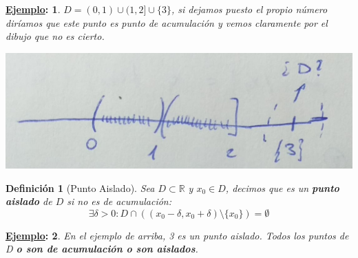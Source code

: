 \documentclass[10pt,a4paper,openright]{book}
\theoremstyle{break}
\newtheorem*{defi}{Definición}
\newtheorem*{ej}{\underline{Ejemplo}:}
\begin{document}
\begin{ej}
$D=(0,1)\cup (1,2]\cup \{3\}$, si dejamos puesto el propio número diríamos que este punto es punto de acumulación y vemos claramente por el dibujo que no es cierto.
\end{ej}

\begin{center}
\includegraphics[scale=0.20]{Cauchy 2}
\end{center}

\begin{defi}[Punto Aislado]
Sea $D\subset \mathbb R$ y $x_0\in D$, decimos que es un \textbf{punto aislado} de $D$ si no es de acumulación:
$$\exists \delta >0 : D\cap \left((x_0-\delta, x_0+\delta)\mbox{\textbackslash} \{x_0\}\right)= \emptyset$$
\end{defi}

\begin{ej}
En el ejemplo de arriba, 3 es un punto aislado. Todos los puntos de D \textbf{o son de acumulación o son aislados}.
\end{ej}
\end{document}
